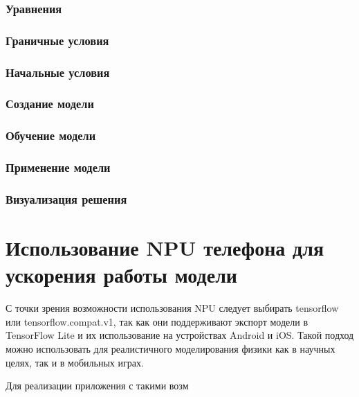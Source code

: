 \subsection{Уравнения}

\subsection{Граничные условия}

\subsection{Начальные условия}

\subsection{Создание модели}

\subsection{Обучение модели}

\subsection{Применение модели}

\subsection{Визуализация решения}


\chapter{Использование NPU телефона для ускорения работы модели \cite{nnapi}}

С точки зрения возможности использования NPU следует выбирать tensorflow или tensorflow.compat.v1,
так как они поддерживают экспорт модели в TensorFlow Lite и их использование на устройствах Android
и iOS. Такой подход можно использовать для реалистичного моделирования физики как в научных целях, так и
в мобильных играх.

Для реализации приложения с такими возм



